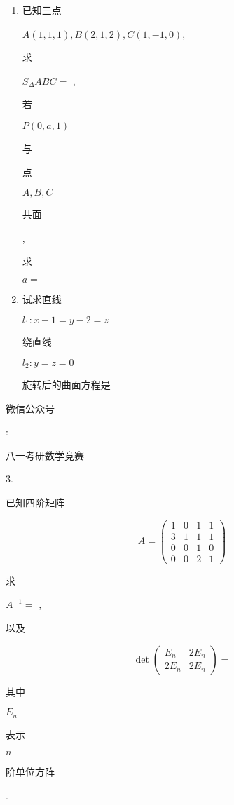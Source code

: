 \documentclass[10pt]{article}
\begin{document}
\begin{enumerate}
  \item \begin{CJK}{UTF8}{mj}已知三点\end{CJK} $A(1,1,1), B(2,1,2), C(1,-1,0)$, \begin{CJK}{UTF8}{mj}求\end{CJK} $S_{\Delta} A B C=$ , \begin{CJK}{UTF8}{mj}若\end{CJK} $P(0, a, 1)$ \begin{CJK}{UTF8}{mj}与\end{CJK} \begin{CJK}{UTF8}{mj}点\end{CJK} $A, B, C$ \begin{CJK}{UTF8}{mj}共面\end{CJK}, \begin{CJK}{UTF8}{mj}求\end{CJK} $a=$

  \item \begin{CJK}{UTF8}{mj}试求直线\end{CJK} $l_{1}: x-1=y-2=z$ \begin{CJK}{UTF8}{mj}绕直线\end{CJK} $l_{2}: y=z=0$ \begin{CJK}{UTF8}{mj}旋转后的曲面方程是\end{CJK}

\end{enumerate}
\begin{CJK}{UTF8}{mj}微信公众号\end{CJK}: \begin{CJK}{UTF8}{mj}八一考研数学竞赛\end{CJK} 3. \begin{CJK}{UTF8}{mj}已知四阶矩阵\end{CJK}
$$
A=\left(\begin{array}{llll}
1 & 0 & 1 & 1 \\
3 & 1 & 1 & 1 \\
0 & 0 & 1 & 0 \\
0 & 0 & 2 & 1
\end{array}\right)
$$
\begin{CJK}{UTF8}{mj}求\end{CJK} $A^{-1}=$ , \begin{CJK}{UTF8}{mj}以及\end{CJK}
$$
\operatorname{det}\left(\begin{array}{cc}
E_{n} & 2 E_{n} \\
2 E_{n} & 2 E_{n}
\end{array}\right)=
$$
\begin{CJK}{UTF8}{mj}其中\end{CJK} $E_{n}$ \begin{CJK}{UTF8}{mj}表示\end{CJK} $n$ \begin{CJK}{UTF8}{mj}阶单位方阵\end{CJK}.
\end{document}
